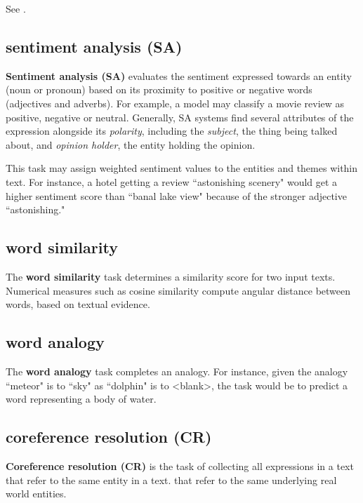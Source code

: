 See .

\subsection{sentiment analysis (SA)} \label{nlptask:sentimentanalysisSA}

\textbf{Sentiment analysis (SA)} evaluates the sentiment expressed towards an entity (noun or pronoun) based on its proximity to positive or negative words (adjectives and adverbs). For example, a model may classify a movie review as positive, negative or neutral. Generally, SA systems find several attributes of the expression alongside its \emph{polarity}, including the \emph{subject}, the thing being talked about, and \emph{opinion holder}, the entity holding the opinion. 

This task may assign weighted sentiment values to the entities and themes within text. For instance, a hotel getting a review ``astonishing scenery" would get a higher sentiment score than ``banal lake view" because of the stronger adjective ``astonishing." 


\subsection{word similarity} \label{nlptask:wordsimilarity}

The \textbf{word similarity} task determines a similarity score for two input texts. Numerical measures such as cosine similarity compute angular distance between words, based on textual evidence. 


\subsection{word analogy} \label{nlptask:wordanalogy}

The \textbf{word analogy} task completes an analogy. For instance, given the analogy ``meteor" is to ``sky" as ``dolphin" is to <blank>, the task would be to predict a word representing a body of water. 


\subsection{coreference resolution (CR)} \label{nlptask:coreferenceresolutionCR}

\textbf{Coreference resolution (CR)} is the task of collecting all expressions in a text that refer to the same entity in a text.  that refer to the same underlying real world entities. 

